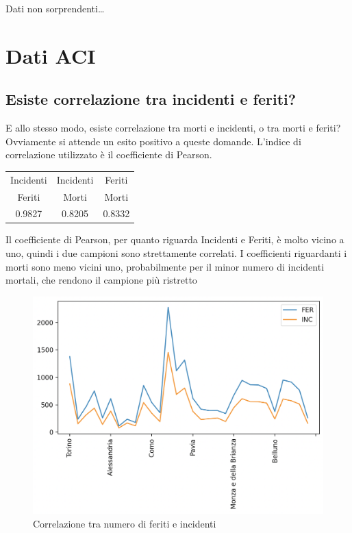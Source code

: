 \documentclass[a4paper]{report}
\begin{document}
Dati non sorprendenti\dots





\section{Dati ACI}

\subsection{Esiste correlazione tra incidenti e feriti?}

E allo stesso modo, esiste correlazione tra morti e incidenti, o tra morti e feriti?\\
Ovviamente si attende un esito positivo a queste domande.
L'indice di correlazione utilizzato è il coefficiente di Pearson.
\begin{center}
    \begin{tabular}{ |c|c|c| } 
    \hline
    Incidenti & Incidenti & Feriti \\ 
    Feriti & Morti & Morti \\ 
    \hline
    0.9827 & 0.8205 & 0.8332 \\ 
    \hline
    \end{tabular}
\end{center}

Il coefficiente di Pearson, per quanto riguarda Incidenti e Feriti, 
è molto vicino a uno, quindi i due campioni sono strettamente correlati.
I coefficienti riguardanti i morti sono meno vicini uno, probabilmente per il minor numero 
di incidenti mortali, che rendono il campione più ristretto

\begin{figure}
    \includegraphics[width=\linewidth]{../src/incidenti/incidenti_aci/comuni/corr_incidenti_feriti.png}
    \caption{Correlazione tra numero di feriti e incidenti}
    \label{fig:corr_incidenti_feriti}
\end{figure}
\end{document}
